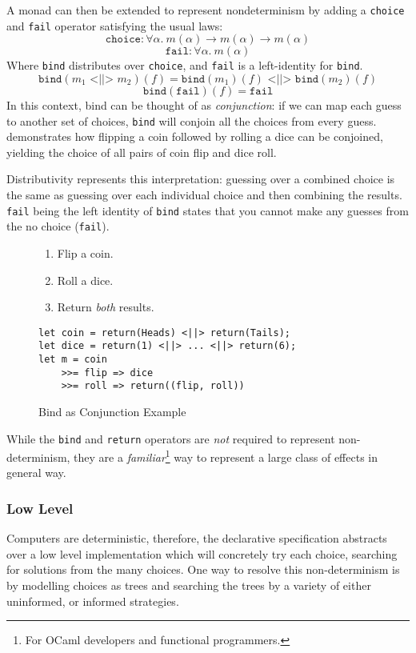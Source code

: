 A monad can then be extended to represent nondeterminism by adding a \texttt{choice} and \texttt{fail} operator satisfying the usual laws:
\[\texttt{choice} : \forall \alpha.\ m(\alpha) \to m(\alpha) \to m(\alpha)\]
\[\texttt{fail} : \forall \alpha.\ m(\alpha)\]
Where \texttt{bind} distributes over \texttt{choice}, and \texttt{fail} is a left-identity for \texttt{bind}.
\[\texttt{bind}(m_1 \texttt{ <||> } m_2)(f) = \texttt{bind}(m_1)(f) \texttt{ <||> } \texttt{bind}(m_2)(f)\]
\[\texttt{bind}(\texttt{fail})(f) = \texttt{fail}\]
In this context, bind can be thought of as \textit{conjunction}: if we can map each guess to another set of choices, \texttt{bind} will conjoin all the choices from every guess.  demonstrates how flipping a coin followed by rolling a dice can be conjoined, yielding the choice of all pairs of coin flip and dice roll.

Distributivity represents this interpretation:  guessing over a combined choice is the same as guessing over each individual choice and then combining the results. \texttt{fail} being the left identity of \texttt{bind} states that you cannot make any guesses from the no choice (\texttt{fail}). 
\begin{figure}[h]\centering
\begin{enumerate}
\item Flip a coin.
\item Roll a dice.
\item Return \textit{both} results.
\end{enumerate}
\begin{verbatim}
let coin = return(Heads) <||> return(Tails);
let dice = return(1) <||> ... <||> return(6);
let m = coin 
    >>= flip => dice
    >>= roll => return((flip, roll))
\end{verbatim}
\caption{Bind as Conjunction Example}
\label{fig:Conjunction}
\end{figure}

While the \texttt{bind} and \texttt{return} operators are \textit{not} required to represent non-determinism, they are a \textit{familiar}\footnote{For OCaml developers and functional programmers.} way to represent a large class of effects in general way. 

\subsubsection{Low Level}
Computers are deterministic, therefore, the declarative specification abstracts over a low level implementation which will concretely try each choice, searching for solutions from the many choices. One way to resolve this non-determinism is by modelling choices as trees and searching the trees by a variety of either uninformed, or informed strategies.

